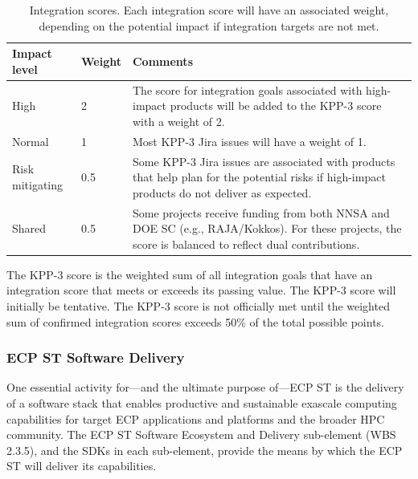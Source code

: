 \begin{table}[h!]
	\begin{tabular}{|L{1.0in}|L{0.5in}|L{4.5in}|}\hline
		Impact level & Weight & Comments\\\hline
		High & 2 & The score for integration goals associated with high-impact products will be added to the KPP-3 score with a weight of 2.\\\hline
		Normal & 1 & Most KPP-3 Jira issues will have a weight of 1.\\\hline
		Risk mitigating & 0.5 & Some KPP-3 Jira issues are associated with products that help plan for the potential risks if high-impact products do not deliver as expected.\\\hline
		Shared  & 0.5 & Some projects receive funding from both NNSA and DOE SC (e.g., RAJA/Kokkos). For these projects, the score is balanced to reflect dual contributions.\\\hline
	\end{tabular}
	\caption{\label{table:KPP-3-impact} Integration scores. Each integration score will have an associated weight, depending on the potential impact if integration targets are not met.}
\end{table}

The KPP-3 score is the weighted sum of all integration goals that have an integration score that meets or exceeds its passing value. 
The KPP-3 score will initially be tentative.  The KPP-3 score is not officially met until the weighted sum of confirmed integration scores exceeds 50\% of the total possible points.


\subsubsection{ECP ST Software Delivery}
One essential activity for---and the ultimate purpose of---ECP ST is the delivery of a software stack that enables productive and sustainable exascale computing capabilities for target ECP applications and platforms and the broader HPC community. The ECP ST Software Ecosystem and Delivery sub-element (WBS 2.3.5), and the SDKs in each sub-element, provide the means by which the ECP ST will deliver its capabilities.
